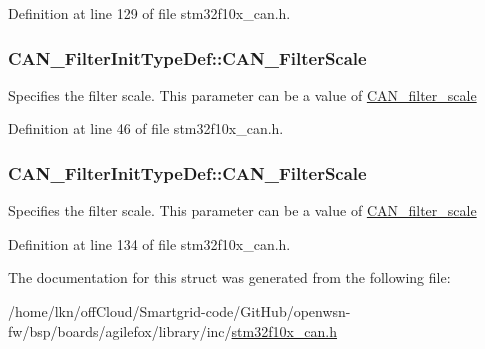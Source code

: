 Definition at line 129 of file stm32f10x\+\_\+can.\+h.

\subsubsection[{\texorpdfstring{C\+A\+N\+\_\+\+Filter\+Scale}{CAN_FilterScale}}]{ C\+A\+N\+\_\+\+Filter\+Init\+Type\+Def\+::\+C\+A\+N\+\_\+\+Filter\+Scale}\hypertarget{struct_c_a_n___filter_init_type_def_a84cad6632627c90a33bbfd4e8a7689bf}{}\label{struct_c_a_n___filter_init_type_def_a84cad6632627c90a33bbfd4e8a7689bf}
Specifies the filter scale. This parameter can be a value of \hyperlink{group___c_a_n__filter__scale}{C\+A\+N\+\_\+filter\+\_\+scale} 

Definition at line 46 of file stm32f10x\+\_\+can.\+h.

\subsubsection[{\texorpdfstring{C\+A\+N\+\_\+\+Filter\+Scale}{CAN_FilterScale}}]{ C\+A\+N\+\_\+\+Filter\+Init\+Type\+Def\+::\+C\+A\+N\+\_\+\+Filter\+Scale}\hypertarget{struct_c_a_n___filter_init_type_def_a9d52661aca538dbfcafdda6f16dddc82}{}\label{struct_c_a_n___filter_init_type_def_a9d52661aca538dbfcafdda6f16dddc82}
Specifies the filter scale. This parameter can be a value of \hyperlink{group___c_a_n__filter__scale}{C\+A\+N\+\_\+filter\+\_\+scale} 

Definition at line 134 of file stm32f10x\+\_\+can.\+h.



The documentation for this struct was generated from the following file\+:\begin{DoxyCompactItemize}
\item 
/home/lkn/off\+Cloud/\+Smartgrid-\/code/\+Git\+Hub/openwsn-\/fw/bsp/boards/agilefox/library/inc/\hyperlink{agilefox_2library_2inc_2stm32f10x__can_8h}{stm32f10x\+\_\+can.\+h}\end{DoxyCompactItemize}
